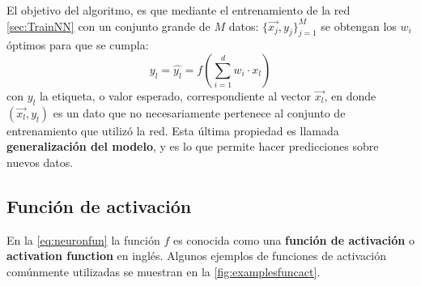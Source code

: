 El objetivo del algoritmo, es que mediante el entrenamiento de la red \autoref{sec:TrainNN} con un conjunto grande de $M$ datos: $\{\vec{x_j},y_j\}_{j=1}^{M}$ se obtengan los $w_i$ óptimos para que se cumpla:
$$y_l= \hat{y_l} = f\left( \sum_{i=1}^dw_i\cdot x_l \right)$$
con $y_l$ la etiqueta, o valor esperado, correspondiente al vector $\vec{x_l}$, en donde $(\vec{x_l},y_l)$ es un dato que no necesariamente pertenece al conjunto de entrenamiento que utilizó la red. Esta última propiedad es llamada \textbf{generalización del modelo}, y es lo que permite hacer predicciones sobre nuevos datos.

\subsection{Función de activación}\label{sec:FuncAct}

En la \autoref{eq:neuronfun} la función $f$ es conocida como una \textbf{función de activación} o \textbf{activation function} en inglés. Algunos ejemplos de funciones de activación comúnmente utilizadas se muestran en la \autoref{fig:examplesfuncact}. 

